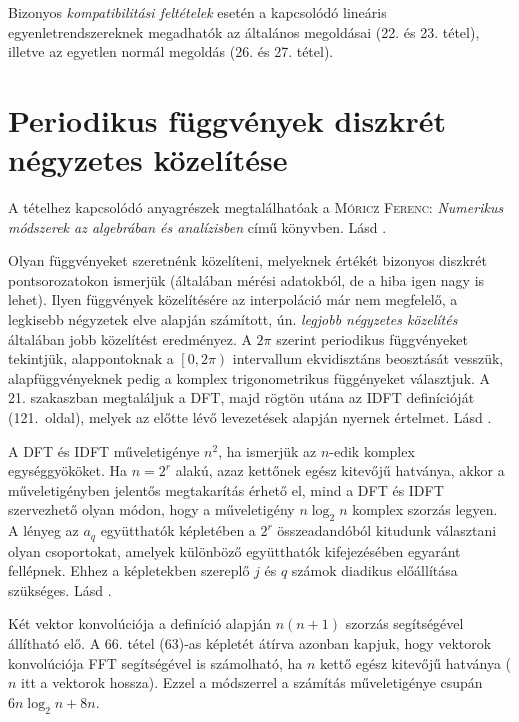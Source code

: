 \documentclass[DIV=15,appendixprefix]{scrreprt}
\theoremstyle{definition}
\theoremstyle{remark}
\begin{document}
Bizonyos \emph{kompatibilitási feltételek} esetén a kapcsolódó lineáris egyenletrendszereknek
megadhatók az általános megoldásai (22. és 23. tétel), illetve az egyetlen normál megoldás (26. és 27. tétel).
%
\section{Periodikus függvények diszkrét négyzetes közelítése}
A tételhez kapcsolódó anyagrészek megtalálhatóak a \textsc{Móricz Ferenc}: \emph{Numerikus módszerek
az algebrában és analízisben} \cite[V. fejezet, 21. és 22. szakaszok]{Moricz1997} című könyvben.
%
Lásd \cite[V. fejezet, 21. szakasz]{Moricz1997}.

Olyan függvényeket szeretnénk közelíteni, melyeknek értékét bizonyos diszkrét pontsorozatokon
ismerjük (általában mérési adatokból, de a hiba igen nagy is lehet). Ilyen függvények közelítésére
az interpoláció már nem megfelelő, a legkisebb négyzetek elve alapján számított, ún. \emph{legjobb
négyzetes közelítés} általában jobb közelítést eredményez. A $ 2 \pi $ szerint periodikus
függvényeket tekintjük, alappontoknak a $ \left.\left[0,{} 2 \pi \right)\right. $ intervallum
ekvidisztáns beosztását vesszük, alapfüggvényeknek pedig a komplex trigonometrikus függényeket
választjuk. A 21. szakaszban megtaláljuk a DFT, majd rögtön utána az IDFT definícióját (121.~oldal),
melyek az előtte lévő levezetések alapján nyernek értelmet.
%
Lásd \cite[V. fejezet, 22. szakasz első fele]{Moricz1997}.

A DFT és IDFT műveletigénye $ n^{ 2 } $, ha ismerjük az $ n $-edik komplex egységgyököket. Ha
$ n = 2^{ r } $ alakú, azaz kettőnek egész kitevőjű hatványa, akkor a műveletigényben jelentős
megtakarítás érhető el, mind a DFT és IDFT szervezhető olyan módon, hogy a műveletigény $ n \log_2
n $ komplex szorzás legyen. A lényeg az $ a_{ q } $ együtthatók képletében a $ 2^{ r } $
összeadandóból kitudunk választani olyan csoportokat, amelyek különböző együtthatók kifejezésében
egyaránt fellépnek. Ehhez a képletekben szereplő $ j $ és $ q $ számok diadikus előállítása
szükséges.
%
Lásd \cite[V. fejezet, 22. szakasz második fele]{Moricz1997}.

Két vektor konvolúciója a definíció alapján $ n \left( n + 1 \right) $ szorzás segítségével
állítható elő. A 66. tétel (63)-as képletét átírva azonban kapjuk, hogy vektorok konvolúciója FFT
segítségével is számolható, ha $ n $ kettő egész kitevőjű hatványa ($ n $ itt a vektorok hossza).
Ezzel a módszerrel a számítás műveletigénye csupán $ 6 n \log_{ 2 } n + 8 n $.
%
\end{document}
